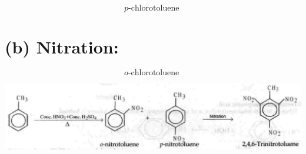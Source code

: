 \documentclass[10pt]{article}
\begin{document}
$$
p \text {-chlorotoluene }
$$

\section*{(b) Nitration:}
$$
o \text {-chlorotoluene }
$$

\begin{center}
\includegraphics[max width=\textwidth]{2025_01_28_8470952b98110cec3aabg-214(4)}
\end{center}
\end{document}
